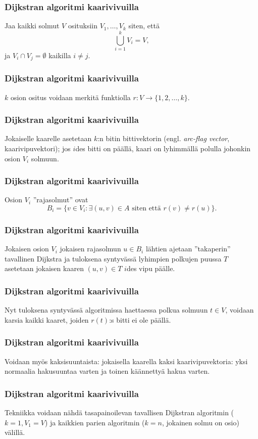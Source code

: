 \documentclass{beamer}
\begin{document}
\begin{frame}
  \frametitle{Dijkstran algoritmi kaarivivuilla}
    Jaa kaikki solmut $V$ osituksiin $V_1, \dots, V_k$ siten, että
    \[
      \bigcup_{i = 1}^k V_i = V,
    \]
    ja $V_i \cap V_j = \emptyset$ kaikilla $i \neq j$.
\end{frame}

\begin{frame}
  \frametitle{Dijkstran algoritmi kaarivivuilla}
  $k$ osion ositus voidaan merkitä funktiolla $r \colon V \to \{ 1, 2, \dots, k\}$.
\end{frame}

\begin{frame}
  \frametitle{Dijkstran algoritmi kaarivivuilla}
  Jokaiselle kaarelle asetetaan $k$:n bitin bittivektorin (engl. \textit{arc-flag vector}, kaarivipuvektori); jos $i$des bitti on päällä, kaari on lyhimmällä polulla johonkin osion $V_i$ solmuun.
\end{frame}

\begin{frame}
  \frametitle{Dijkstran algoritmi kaarivivuilla}
  Osion $V_i$ ''rajasolmut'' ovat \[
    B_i = \{ v \in V_i \colon \exists (u, v) \in A \text{ siten että } r(v) \neq r(u) \}.
  \]
\end{frame}

\begin{frame}
  \frametitle{Dijkstran algoritmi kaarivivuilla}
  Jokaisen osion $V_i$ jokaisen rajasolmun $u \in B_i$ lähtien ajetaan ''takaperin'' tavallinen Dijkstra ja tuloksena syntyvässä lyhimpien polkujen puussa $T$ asetetaan jokaisen kaaren $(u, v) \in T$ $i$des vipu päälle.
\end{frame}

\begin{frame}
  \frametitle{Dijkstran algoritmi kaarivivuilla}
  Nyt tuloksena syntyvässä algoritmissa haettaessa polkua solmuun $t \in V$, voidaan karsia kaikki kaaret, joiden $r(t)$:s bitti ei ole päällä.
\end{frame}

\begin{frame}
  \frametitle{Dijkstran algoritmi kaarivivuilla}
  Voidaan myös kaksisuuntaista: jokaisella kaarella kaksi kaarivipuvektoria: yksi normaalia hakusuuntaa varten ja toinen käännettyä hakua varten.
\end{frame}

\begin{frame}
  \frametitle{Dijkstran algoritmi kaarivivuilla}
  Tekniikka voidaan nähdä tasapainoilevan tavallisen Dijkstran algoritmin ($k = 1, V_1 = V$) ja kaikkien parien algoritmin ($k = n$, jokainen solmu on osio) välillä.
\end{frame}
\end{document}
